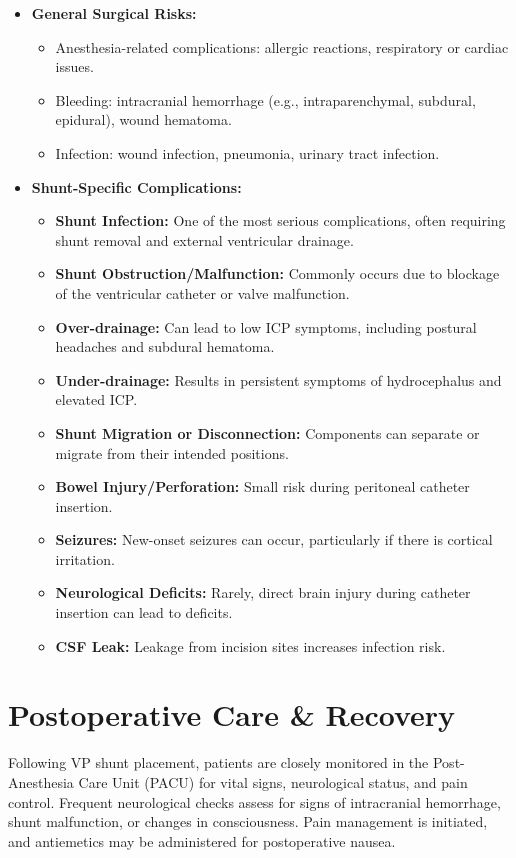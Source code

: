 \begin{itemize}
  \item \textbf{General Surgical Risks:}
    \begin{itemize}
      \item Anesthesia-related complications: allergic reactions, respiratory or cardiac issues.
      \item Bleeding: intracranial hemorrhage (e.g., intraparenchymal, subdural, epidural), wound hematoma.
      \item Infection: wound infection, pneumonia, urinary tract infection.
    \end{itemize}
  
  \item \textbf{Shunt-Specific Complications:}
    \begin{itemize}
      \item \textbf{Shunt Infection:} One of the most serious complications, often requiring shunt removal and external ventricular drainage.
      \item \textbf{Shunt Obstruction/Malfunction:} Commonly occurs due to blockage of the ventricular catheter or valve malfunction.
      \item \textbf{Over-drainage:} Can lead to low ICP symptoms, including postural headaches and subdural hematoma.
      \item \textbf{Under-drainage:} Results in persistent symptoms of hydrocephalus and elevated ICP.
      \item \textbf{Shunt Migration or Disconnection:} Components can separate or migrate from their intended positions.
      \item \textbf{Bowel Injury/Perforation:} Small risk during peritoneal catheter insertion.
      \item \textbf{Seizures:} New-onset seizures can occur, particularly if there is cortical irritation.
      \item \textbf{Neurological Deficits:} Rarely, direct brain injury during catheter insertion can lead to deficits.
      \item \textbf{CSF Leak:} Leakage from incision sites increases infection risk.
    \end{itemize}
\end{itemize}

\section*{Postoperative Care \& Recovery}
Following VP shunt placement, patients are closely monitored in the Post-Anesthesia Care Unit (PACU) for vital signs, neurological status, and pain control. Frequent neurological checks assess for signs of intracranial hemorrhage, shunt malfunction, or changes in consciousness. Pain management is initiated, and antiemetics may be administered for postoperative nausea.

